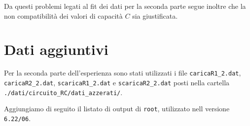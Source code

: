 \documentclass[italian, a4paper, 10pt, twocolumn]{../../style/lab_unige}
\newcommand{\cernroot}{\texttt{root}}
\begin{document}
    Da questi problemi legati al fit dei dati per la seconda parte segue inoltre che la non compatibilità dei valori di capacità $C$ sia giustificata.

    \appendix

    \setcounter{table}{0}
    \renewcommand{\thetable}{A\arabic{table}}

    \section{Dati aggiuntivi}
    \label{section:appendix_EXT_DATA}

    Per la seconda parte dell'esperienza sono stati utilizzati i file \verb|caricaR1_2.dat|, \verb|caricaR2_2.dat|, \verb|scaricaR1_2.dat| e \verb|scaricaR2_2.dat| posti nella cartella \verb|./dati/circuito_RC/dati_azzerati/|.

    Aggiungiamo di seguito il listato di output di \cernroot, utilizzato nell versione \verb|6.22/06|.
    
    
\end{document}
